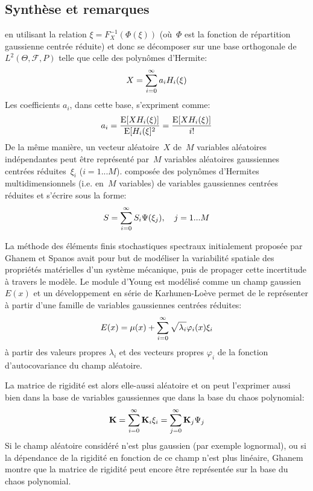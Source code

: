 \medskip
\subsection{Synthèse et remarques}

 en utilisant la relation $\xi=F_X^{-1}(\Phi(\xi))$ (où~$\Phi$ est la fonction de répartition gaussienne centrée réduite) et donc se décomposer sur une base orthogonale de~$L^2(\Theta,\mathcal{F},P)$ telle que celle des polynômes d'Hermite: 
$$X=\displaystyle\sum_{i=0}^\infty a_i H_i(\xi)$$
Les coefficients $a_i$, dans cette base, s'expriment comme: 
$$a_i=\dfrac{\operatorname{E}[XH_i(\xi)]}{\operatorname{E}[H_i(\xi]^2}=\dfrac{\operatorname{E}[XH_i(\xi)]}{i!}$$
De la même manière, un vecteur aléatoire~$X$ de~$M$ variables aléatoires indépendantes peut être représenté par~$M$ variables aléatoires gaussiennes centrées réduites~$\xi_i$ ($i=1...M$).  composée des polynômes d'Hermites multidimensionnels (i.e. en~$M$ variables) de variables gaussiennes centrées réduites et s'écrire sous la forme: 
$$S=\displaystyle\sum_{i=0}^\infty S_i\Psi(\xi_j), \quad j=1...M$$

\medskip
La méthode des éléments finis stochastiques spectraux initialement proposée par Ghanem et Spanos avait pour but de modéliser la variabilité spatiale des propriétés matérielles d'un système mécanique, puis de propager cette incertitude à travers le modèle. Le module d'Young est modélisé comme un champ gaussien $E(x)$ et un développement en série de Karhunen-Loève permet de le représenter à partir d'une famille de variables gaussiennes centrées réduites:
$$ E(x) = \mu(x) + \displaystyle\sum_{i=0}^\infty \sqrt{\lambda_i}\varphi_i(x)\xi_i $$
à partir des valeurs propres $\lambda_i$ et des vecteurs propres $\varphi_i$ de la fonction d'autocovariance du champ aléatoire. 

La matrice de rigidité est alors elle-aussi aléatoire et on peut l'exprimer aussi bien dans la base de variables gaussiennes que dans la base du chaos polynomial:
$$ \MM{K}=\dsum_{i=0}^\infty \MM{K}_i\xi_i = \dsum_{j=0}^\infty \MM{K}_j\Psi_j $$
Si le champ aléatoire considéré n'est plus gaussien (par exemple lognormal), ou si la dépendance de la rigidité en fonction de ce champ n'est plus linéaire, Ghanem montre que la matrice de rigidité peut encore être représentée sur la base du chaos polynomial. 

